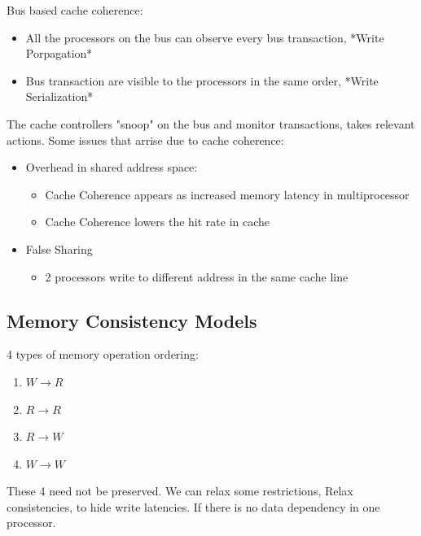\documentclass{article}
\begin{document}
Bus based cache coherence:
\begin{itemize}
    \item All the processors on the bus can observe every bus transaction, *Write Porpagation*
    \item Bus transaction are visible to the processors in the same order, *Write Serialization*
\end{itemize}
The cache controllers "snoop" on the bus and monitor transactions, takes relevant actions.
Some issues that arrise due to cache coherence:
\begin{itemize}
    \item Overhead in shared address space:
          \begin{itemize}
              \item Cache Coherence appears as increased memory latency in multiprocessor
              \item Cache Coherence lowers the hit rate in cache
          \end{itemize}
    \item False Sharing
          \begin{itemize}
              \item 2 processors write to different address in the same cache line
          \end{itemize}
\end{itemize}

\subsection{Memory Consistency Models}
4 types of memory operation ordering:
\begin{enumerate}
    \item $W \rightarrow R$
    \item $R \rightarrow R$
    \item $R \rightarrow W$
    \item $W \rightarrow W$
\end{enumerate}

These 4 need not be preserved.
We can relax some restrictions, Relax consistencies, to hide write latencies.
If there is no data dependency in one processor.
\end{document}
